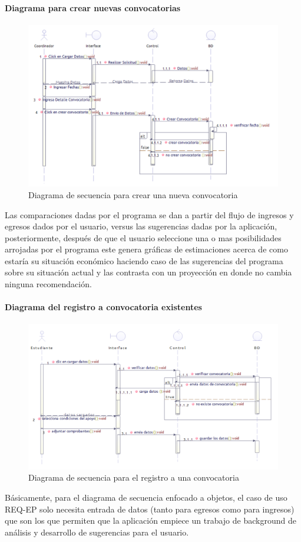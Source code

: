 \paragraph{Diagrama para crear nuevas convocatorias}
\begin{figure}[H]
	\centering
	\includegraphics[width=0.8\linewidth]{parte2/imgs/DiagramaSecuencia/SecCrearConv}
	\caption[Diagrama de secuencia Crear convocatoria]{Diagrama de secuencia para crear una nueva convocatoria}
	\label{fig:diagramadesecuencia5}
\end{figure}

Las comparaciones dadas por el programa se dan a partir del flujo de ingresos y egresos dados por el usuario, versus las sugerencias dadas por la aplicación, posteriormente, después de que el usuario seleccione una o mas posibilidades arrojadas por el programa este genera gráficas de estimaciones acerca de como estaría su situación económico haciendo caso de las sugerencias del programa sobre su situación actual y las contrasta con un proyección en donde no cambia ninguna recomendación. 

\paragraph{Diagrama del registro a convocatoria existentes}
\begin{figure}[H]
	\centering
	\includegraphics[width=0.8\linewidth]{parte2/imgs/DiagramaSecuencia/SecSolConv}
	\caption[Diagrama de secuencia Registro a una convocatoria]{Diagrama de secuencia para el registro a una convocatoria}
	\label{fig:diagramadesecuencia3}
\end{figure}
Básicamente, para el diagrama de secuencia enfocado a objetos, el caso de uso REQ-EP solo necesita entrada de datos (tanto para egresos como para ingresos) que son los que permiten que la aplicación empiece un trabajo de background de análisis y desarrollo de sugerencias para el usuario.

